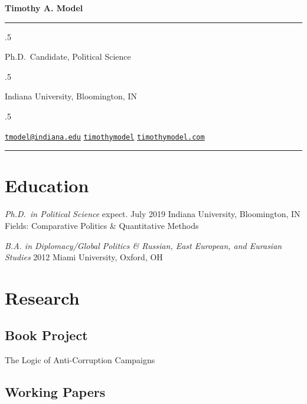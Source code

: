 \documentclass[11pt,]{article}
\begin{document}
\centerline{\huge \bf Timothy A. Model}

\vspace{2 mm}

\hrule

\vspace{2 mm}

\moveleft.5\hoffset\centerline{Ph.D.~Candidate, Political Science}
\moveleft.5\hoffset\centerline{Indiana University, Bloomington, IN}
\moveleft.5\hoffset\centerline{ \faEnvelopeO \hspace{1 mm} \href{mailto:}{\tt \href{mailto:tmodel@indiana.edu}{\nolinkurl{tmodel@indiana.edu}}} \hspace{1 mm}  \faGithub \hspace{1 mm} \href{http://github.com/timothymodel}{\tt timothymodel} \hspace{1 mm}    \faGlobe \hspace{1 mm} \href{http://timothymodel.com}{\tt timothymodel.com}   }

\vspace{2 mm}

\hrule


\hypertarget{education}{%
\section{Education}\label{education}}

\emph{Ph.D.~in Political Science} \hfill expect. July 2019 \newline
Indiana University, Bloomington, IN \hfill \newline Fields: Comparative
Politics \& Quantitative Methods

\emph{B.A. in Diplomacy/Global Politics \& Russian, East European, and
Eurasian Studies} \hfill 2012 \newline Miami University, Oxford, OH

\hypertarget{research}{%
\section{Research}\label{research}}

\hypertarget{book-project}{%
\subsection{Book Project}\label{book-project}}

The Logic of Anti-Corruption Campaigns

\hypertarget{working-papers}{%
\subsection{Working Papers}\label{working-papers}}
\end{document}
